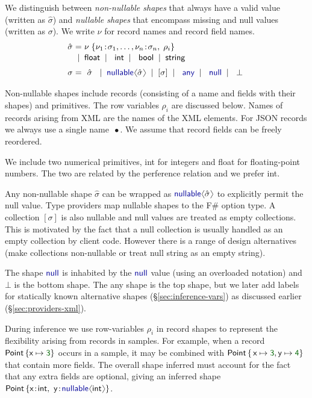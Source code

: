 \documentclass[10pt]{sigplanconf}
\newcommand{\langl}{\begin{picture}(4.5,7)
\put(1.1,2.5){\rotatebox{60}{\line(1,0){5.5}}}
\put(1.1,2.5){\rotatebox{300}{\line(1,0){5.5}}}
\end{picture}}
\newcommand{\rangl}{\begin{picture}(4.5,7)
\put(.9,2.5){\rotatebox{120}{\line(1,0){5.5}}}
\put(.9,2.5){\rotatebox{240}{\line(1,0){5.5}}}
\end{picture}}
\newcommand{\kvd}[1]{\textnormal{\textcolor{kvdclr}{\sffamily #1}}}
\newcommand{\num}[1]{\textnormal{\textcolor{numclr}{\sffamily #1}}}
\newcommand{\ident}[1]{\textnormal{\sffamily #1}}
\newcommand{\lsep}[0]{\;\; | \;\;}
\newcommand{\narrow}[1]{\hspace{-0.7em} #1 \hspace{-0.7em}}
\begin{document}
We distinguish between \emph{non-nullable shapes} that always have a valid value (written as 
$\hat{\sigma}$) and \emph{nullable shapes} that encompass missing and \kvd{null} values 
(written as $\sigma$). We write $\nu$ for record names and record field names. 
%
\begin{equation*}
\begin{array}{rcl}
 \hat{\sigma} &\narrow{=}& \nu \; \{ \nu_1 \!:\! \sigma_1, \ldots, \nu_n \!:\! \sigma_n,\; \rho_i  \} \\[0.1em]
                &\narrow{|}& \ident{float} \lsep \ident{int} \lsep \ident{bool} \lsep \ident{string} 
 \\[0.6em] 
       \sigma &\narrow{=}& ~\hat{\sigma}~ \lsep \kvd{nullable}\langl \hat{\sigma} \rangl \lsep [\sigma] \lsep \kvd{any} \lsep \kvd{null}  \lsep ~\bot~
\end{array}
\end{equation*}

\noindent
Non-nullable shapes include records (consisting of a name and fields with their shapes) and 
primitives. The row variables $\rho_i$ are discussed below. Names of records arising from XML are the names of the XML elements.
For JSON records we always use a single name $\,\bullet$. We assume that record fields can be freely
reordered.

We include two numerical primitives, \ident{int} for integers and \ident{float} for floating-point 
numbers. The two are related by the perference relation and we prefer \ident{int}.

Any non-nullable shape $\hat{\sigma}$ can be wrapped as $\kvd{nullable}\langl\hat{\sigma}\rangl$ to 
explicitly permit the \kvd{null} value. Type providers map \kvd{nullable} shapes to the F\# option
type. A collection $[\sigma]$ is also nullable and \kvd{null} values are treated as empty 
collections. This is motivated by the fact that a \kvd{null} collection is usually
handled as an empty collection by client code. However there is a range of design alternatives (make collections
non-nullable or treat \kvd{null} \ident{string} as an empty string).

The shape $\kvd{null}$ is inhabited by the $\kvd{null}$ value (using an overloaded 
notation) and $\bot$ is the bottom shape. The \kvd{any} shape is the top shape, but we later add
labels for statically known alternative shapes (\S\ref{sec:inference-vars}) as 
discussed earlier (\S\ref{sec:providers-xml}).

During inference we use row-variables $\rho_i$ \cite{rows-cardelli} in record shapes to represent 
the flexibility arising from records in samples. For example, when a 
record $\ident{Point}\,\{ \ident{x} \mapsto \num{3} \}$ occurs in a sample,
it may be combined with $\ident{Point}\,\{\, \ident{x}\mapsto\num{3}, \ident{y}\mapsto\num{4} \}$ that contain more fields. The
overall shape inferred must account for the fact that any extra fields are optional,
giving an inferred shape $\ident{Point}\,\{ \ident{x}\!:\!\ident{int},~ \ident{y}\!:\!\kvd{nullable}\langl\ident{int}\rangl\}$.
\end{document}
